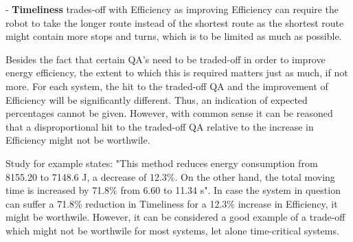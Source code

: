 - \textbf{Timeliness} trades-off with Efficiency as improving Efficiency can require the robot to take the longer route instead of the shortest route
as the shortest route might contain more stops and turns, which is to be limited as much as possible.

\vspace{5mm}

Besides the fact that certain QA's need to be traded-off in order to improve energy efficiency, the extent to which this is required 
matters just as much, if not more.
For each system, the hit to the traded-off QA and the improvement of Efficiency will be significantly different.
Thus, an indication of expected percentages cannot be given.
However, with common sense it can be reasoned that a disproportional hit to the traded-off QA relative to the increase in Efficiency might not be worthwile.

Study \cite{kaitwanidvilai2020industrial_robot_cycle_time} for example states: "This method reduces energy consumption from 8155.20 to 7148.6 J, 
a decrease of 12.3\%.  On the other hand, the total moving time is increased by 71.8\% from 6.60 to 11.34 s". 
In case the system in question can suffer a 71.8\% reduction in Timeliness for a 12.3\% increase in Efficiency, it might be worthwile.
However, it can be considered a good example of a trade-off which might not be worthwile for most systems, let alone time-critical systems.

